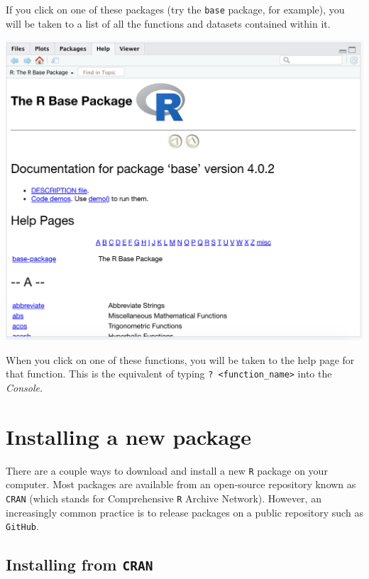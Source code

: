 \documentclass[
]{book}
\begin{document}
If you click on one of these packages (try the \texttt{base} package, for example), you will be taken to a list of all the functions and datasets contained within it.

\includegraphics{img/rstudio_base-package.png}

When you click on one of these functions, you will be taken to the help page for that function. This is the equivalent of typing \texttt{?\ \textless{}function\_name\textgreater{}} into the \emph{Console}.

\hypertarget{installing-a-new-package}{%
\section*{Installing a new package}\label{installing-a-new-package}}

There are a couple ways to download and install a new \texttt{R} package on your computer. Most packages are available from an open-source repository known as \texttt{CRAN} (which stands for Comprehensive \texttt{R} Archive Network). However, an increasingly common practice is to release packages on a public repository such as \texttt{GitHub}.

\hypertarget{installing-from-cran}{%
\subsection*{\texorpdfstring{Installing from \texttt{CRAN}}{Installing from CRAN}}\label{installing-from-cran}}
\end{document}
